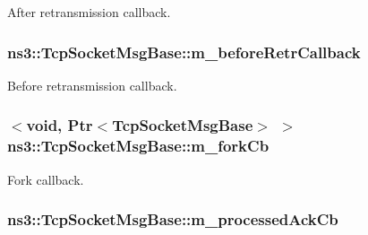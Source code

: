 After retransmission callback. 

\subsubsection[{\texorpdfstring{m\+\_\+before\+Retr\+Callback}{m_beforeRetrCallback}}]{ ns3\+::\+Tcp\+Socket\+Msg\+Base\+::m\+\_\+before\+Retr\+Callback\hspace{0.3cm}{\ttfamily [private]}}\hypertarget{classns3_1_1TcpSocketMsgBase_acc2c27503c22015f393ee2c36ff59a44}{}\label{classns3_1_1TcpSocketMsgBase_acc2c27503c22015f393ee2c36ff59a44}


Before retransmission callback. 

\subsubsection[{\texorpdfstring{m\+\_\+fork\+Cb}{m_forkCb}}]{$<$void, {\bf Ptr}$<${\bf Tcp\+Socket\+Msg\+Base}$>$ $>$ ns3\+::\+Tcp\+Socket\+Msg\+Base\+::m\+\_\+fork\+Cb\hspace{0.3cm}{\ttfamily [private]}}\hypertarget{classns3_1_1TcpSocketMsgBase_ad3f13eb14ba453a59500b6275fa3539e}{}\label{classns3_1_1TcpSocketMsgBase_ad3f13eb14ba453a59500b6275fa3539e}


Fork callback. 

\subsubsection[{\texorpdfstring{m\+\_\+processed\+Ack\+Cb}{m_processedAckCb}}]{ ns3\+::\+Tcp\+Socket\+Msg\+Base\+::m\+\_\+processed\+Ack\+Cb\hspace{0.3cm}{\ttfamily [private]}}\hypertarget{classns3_1_1TcpSocketMsgBase_a13e9a6635995e3cb4af2afc90b0dfa57}{}\label{classns3_1_1TcpSocketMsgBase_a13e9a6635995e3cb4af2afc90b0dfa57}


